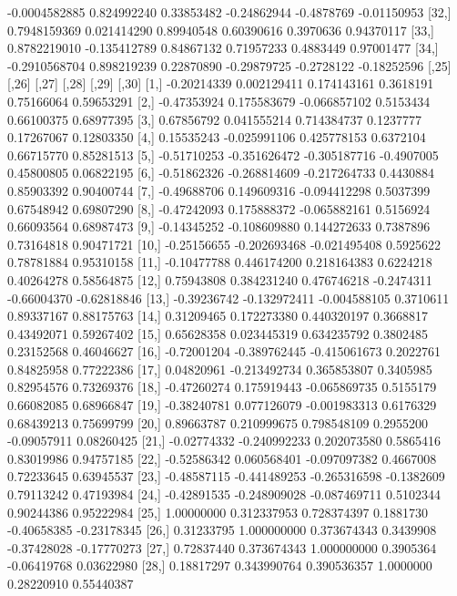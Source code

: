 \documentclass[a4paper,11pt]{scrartcl}
\begin{document}
\begin{Schunk}
\begin{Soutput}
[31,] -0.0004582885  0.824992240  0.33853482 -0.24862944 -0.4878769 -0.01150953
[32,]  0.7948159369  0.021414290  0.89940548  0.60390616  0.3970636  0.94370117
[33,]  0.8782219010 -0.135412789  0.84867132  0.71957233  0.4883449  0.97001477
[34,] -0.2910568704  0.898219239  0.22870890 -0.29879725 -0.2728122 -0.18252596
            [,25]        [,26]        [,27]      [,28]       [,29]       [,30]
 [1,] -0.20214339  0.002129411  0.174143161  0.3618191  0.75166064  0.59653291
 [2,] -0.47353924  0.175583679 -0.066857102  0.5153434  0.66100375  0.68977395
 [3,]  0.67856792  0.041555214  0.714384737  0.1237777  0.17267067  0.12803350
 [4,]  0.15535243 -0.025991106  0.425778153  0.6372104  0.66715770  0.85281513
 [5,] -0.51710253 -0.351626472 -0.305187716 -0.4907005  0.45800805  0.06822195
 [6,] -0.51862326 -0.268814609 -0.217264733  0.4430884  0.85903392  0.90400744
 [7,] -0.49688706  0.149609316 -0.094412298  0.5037399  0.67548942  0.69807290
 [8,] -0.47242093  0.175888372 -0.065882161  0.5156924  0.66093564  0.68987473
 [9,] -0.14345252 -0.108609880  0.144272633  0.7387896  0.73164818  0.90471721
[10,] -0.25156655 -0.202693468 -0.021495408  0.5925622  0.78781884  0.95310158
[11,] -0.10477788  0.446174200  0.218164383  0.6224218  0.40264278  0.58564875
[12,]  0.75943808  0.384231240  0.476746218 -0.2474311 -0.66004370 -0.62818846
[13,] -0.39236742 -0.132972411 -0.004588105  0.3710611  0.89337167  0.88175763
[14,]  0.31209465  0.172273380  0.440320197  0.3668817  0.43492071  0.59267402
[15,]  0.65628358  0.023445319  0.634235792  0.3802485  0.23152568  0.46046627
[16,] -0.72001204 -0.389762445 -0.415061673  0.2022761  0.84825958  0.77222386
[17,]  0.04820961 -0.213492734  0.365853807  0.3405985  0.82954576  0.73269376
[18,] -0.47260274  0.175919443 -0.065869735  0.5155179  0.66082085  0.68966847
[19,] -0.38240781  0.077126079 -0.001983313  0.6176329  0.68439213  0.75699799
[20,]  0.89663787  0.210999675  0.798548109  0.2955200 -0.09057911  0.08260425
[21,] -0.02774332 -0.240992233  0.202073580  0.5865416  0.83019986  0.94757185
[22,] -0.52586342  0.060568401 -0.097097382  0.4667008  0.72233645  0.63945537
[23,] -0.48587115 -0.441489253 -0.265316598 -0.1382609  0.79113242  0.47193984
[24,] -0.42891535 -0.248909028 -0.087469711  0.5102344  0.90244386  0.95222984
[25,]  1.00000000  0.312337953  0.728374397  0.1881730 -0.40658385 -0.23178345
[26,]  0.31233795  1.000000000  0.373674343  0.3439908 -0.37428028 -0.17770273
[27,]  0.72837440  0.373674343  1.000000000  0.3905364 -0.06419768  0.03622980
[28,]  0.18817297  0.343990764  0.390536357  1.0000000  0.28220910  0.55440387

\end{Soutput}
\end{Schunk}
\end{document}

